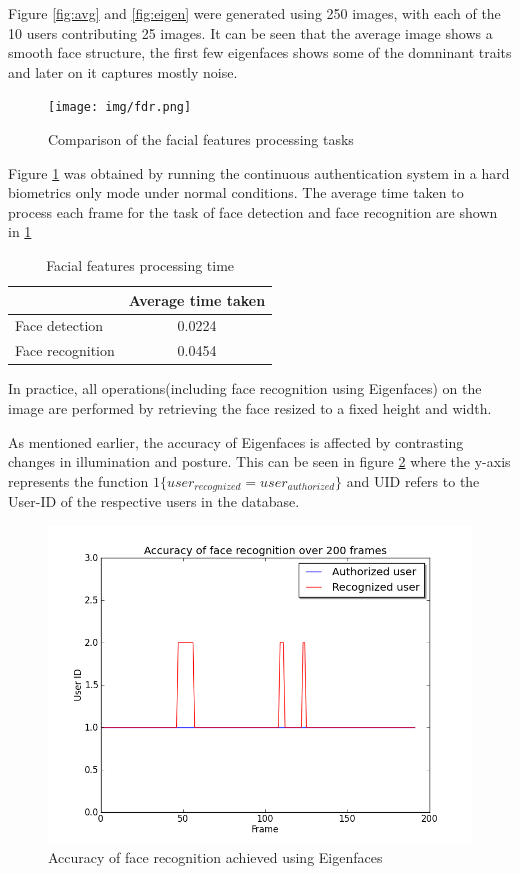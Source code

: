 \documentclass[12pt]{article}			%
\begin{document}
Figure \ref{fig:avg} and \ref{fig:eigen} were generated using 250 images, with each of the 10 users contributing 25 images.
It can be seen that the average image shows a smooth face structure, the first few eigenfaces shows some of the domninant traits and later on it captures mostly noise.

\begin{figure}[h!]
	\centering
	\texttt{[image: img/fdr.png]}
	\caption{Comparison of the facial features processing tasks}
	\label{fig:fdfr}
\end{figure}
Figure \ref{fig:fdfr} was obtained by running the continuous authentication system in a hard biometrics only mode under normal conditions. The average time taken to process each frame for the task of face detection and face recognition are shown in \ref{tab:fdr}

\begin{table}[htp]
	\centering
	\caption{Facial features processing time}
	\begin{tabular}{||l|c||} \hline \hline
			    &  Average time taken \\ \hline
	Face detection      &  0.0224             \\ \hline
	Face recognition    &  0.0454             \\ \hline \hline
	\end{tabular}
	\label{tab:fdr}
\end{table}
In practice, all operations(including face recognition using Eigenfaces) on the image are performed by retrieving the face resized to a fixed height and width.

As mentioned earlier, the accuracy of Eigenfaces is affected by contrasting changes in illumination and posture.
This can be seen in figure \ref{fig:fracc} where the y-axis represents the function $1\{user_{recognized}=user_{authorized}\}$ and UID refers to the User-ID of the respective users in the database.
\begin{figure}[h!]
	\centering
	\includegraphics[scale=0.40]{img/face_rec_accuracy.png}
	\caption{Accuracy of face recognition achieved using Eigenfaces}
	\label{fig:fracc}
\end{figure}
\end{document}
